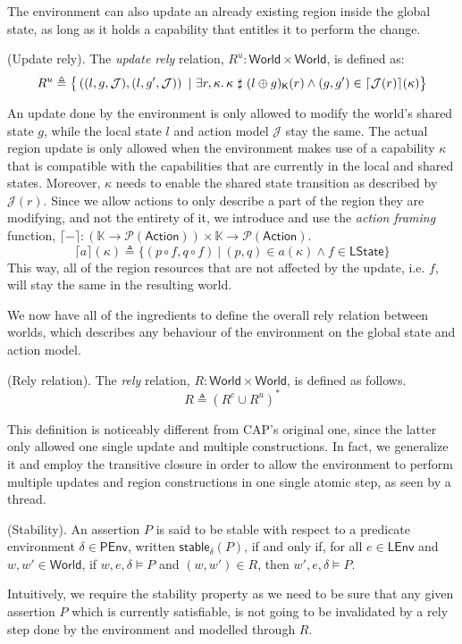 The environment can also update an already existing region inside the global state, as long as it holds a capability that entitles it to perform the change.
\begin{defn}
	(Update rely).
	The \emph{update rely} relation, $R^u : \mathsf{World} \times \mathsf{World}$, is defined as:
	\[
		R^u \triangleq \big\{ \left( (l, g, \mathcal{J}), (l, g', \mathcal{J}) \right)\ |\ \exists r, \kappa \ldotp  \kappa\ \sharp\ (l \oplus g)_\mathsf{K}(r) \land (g, g') \in \lceil \mathcal{J}(r) \rceil (\kappa) \big\}
	\]
\end{defn}
An update done by the environment is only allowed to modify the world's shared state $g$, while the local state $l$ and action model $\mathcal{J}$ stay the same. The actual region update is only allowed when the environment makes use of a capability $\kappa$ that is compatible with the capabilities that are currently in the local and shared states. Moreover, $\kappa$ needs to enable the shared state transition as described by $\mathcal{J}(r)$. Since we allow actions to only describe a part of the region they are modifying, and not the entirety of it, we introduce and use the \emph{action framing} function, $\lceil - \rceil : \left( \mathbb{K} \rightarrow \mathcal{P}(\mathsf{Action}) \right) \times \mathbb{K} \rightarrow \mathcal{P}(\mathsf{Action})$.
	\[
		\lceil a \rceil (\kappa) \triangleq \{ (p \circ f, q \circ f)\ |\ (p, q) \in a(\kappa) \land f \in \mathsf{LState} \}
	\]
This way, all of the region resources that are not affected by the update, i.e. $f$, will stay the same in the resulting world.

We now have all of the ingredients to define the overall rely relation between worlds, which describes any behaviour of the environment on the global state and action model.
\begin{defn}
	(Rely relation).
	The \emph{rely} relation, $R : \mathsf{World} \times \mathsf{World}$, is defined as follows.
	\[
		R \triangleq (R^c \cup R^u)^*
	\]
\end{defn}
This definition is noticeably different from CAP's \cite{cap} original one, since the latter only allowed one single update and multiple constructions. In fact, we generalize it and employ the transitive closure in order to allow the environment to perform multiple updates and region constructions in one single atomic step, as seen by a thread.

\begin{defn}
	(Stability).
	An assertion $P$ is said to be stable with respect to a predicate environment $\delta \in \mathsf{PEnv}$, written $\mathsf{stable}_\delta(P)$, if and only if, for all $e \in \mathsf{LEnv}$ and $w, w' \in \mathsf{World}$, if $w, e, \delta \vDash P$ and $(w, w') \in R$, then $w', e, \delta \vDash P$.
\end{defn}	
Intuitively, we require the stability property as we need to be sure that any given assertion $P$ which is currently satisfiable, is not going to be invalidated by a rely step done by the environment and modelled through $R$.

